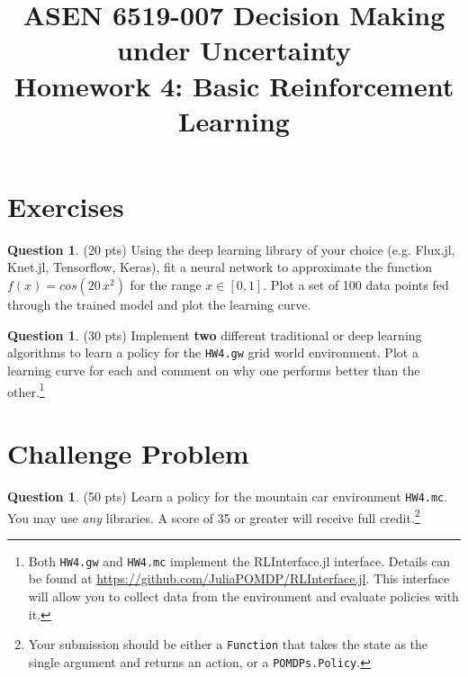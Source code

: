 \documentclass{article}
\title{ASEN 6519-007 Decision Making under Uncertainty\\
       Homework 4: Basic Reinforcement Learning}
\theoremstyle{definition}
\newtheorem{question}[thm]{Question}
\begin{document}
\maketitle

\section{Exercises}

\begin{question}
    (20 pts) Using the deep learning library of your choice (e.g. Flux.jl, Knet.jl, Tensorflow, Keras), fit a neural network to approximate the function $f(x) = cos(20\,x^2)$ for the range $x \in [0,1]$. Plot a set of 100 data points fed through the trained model and plot the learning curve.
\end{question}

\begin{question}
    (30 pts) Implement \textbf{two} different traditional or deep learning algorithms to learn a policy for the \texttt{HW4.gw} grid world environment. Plot a learning curve for each and comment on why one performs better than the other.\footnote{\label{fn:rlinterface}Both \texttt{HW4.gw} and \texttt{HW4.mc} implement the RLInterface.jl interface. Details can be found at \url{https://github.com/JuliaPOMDP/RLInterface.jl}. This interface will allow you to collect data from the environment and evaluate policies with it.}
\end{question}

\section{Challenge Problem}

\begin{question}
    (50 pts) Learn a policy for the mountain car environment \texttt{HW4.mc}. You may use \emph{any} libraries. A score of 35 or greater will receive full credit.\footnotemark[1]\footnote{Your submission should be either a \texttt{Function} that takes the state as the single argument and returns an action, or a \texttt{POMDPs.Policy}.}
\end{question}
\end{document}
